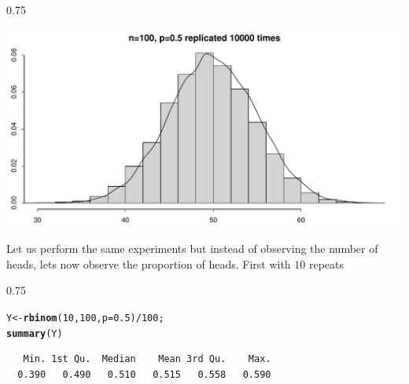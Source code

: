 \documentclass{beamer}\usepackage[]{graphicx}\usepackage[]{color}
\makeatletter
\newcommand{\hlnum}[1]{\textcolor[rgb]{0.2,0.2,0.2}{#1}}%
\newcommand{\hlopt}[1]{\textcolor[rgb]{0.102,0.102,0.102}{#1}}%
\newcommand{\hlstd}[1]{\textcolor[rgb]{0.102,0.102,0.102}{#1}}%
\newcommand{\hlkwb}[1]{\textcolor[rgb]{0.102,0.102,0.102}{#1}}%
\newcommand{\hlkwc}[1]{\textcolor[rgb]{0.2,0.2,0.2}{#1}}%
\newcommand{\hlkwd}[1]{\textcolor[rgb]{0.102,0.102,0.102}{\textbf{#1}}}%
\newenvironment{kframe}{%
 \def\at@end@of@kframe{}%
 \ifinner\ifhmode%
  \def\at@end@of@kframe{\end{minipage}}%
  \begin{minipage}{\columnwidth}%
 \fi\fi%
 \def\FrameCommand##1{\hskip\@totalleftmargin \hskip-\fboxsep
 \colorbox{shadecolor}{##1}\hskip-\fboxsep
     \hskip-\linewidth \hskip-\@totalleftmargin \hskip\columnwidth}%
 \MakeFramed {\advance\hsize-\width
   \@totalleftmargin\z@ \linewidth\hsize
   \@setminipage}}%
 {\par\unskip\endMakeFramed%
 \at@end@of@kframe}
\newenvironment{knitrout}{}{} %
\renewenvironment{knitrout}{\begin{spacing}{0.75}\begin{tiny}}{\end{tiny}\end{spacing}}
\makeatother
\begin{document}
\begin{frame}[fragile]

\begin{knitrout}\small
{}\color{fgcolor}

{\centering \includegraphics[width=0.89\linewidth]{figure/graphics-unnamed-chunk-7-1} 

}



\end{knitrout}

\end{frame}

\begin{frame}[fragile]

Let us perform the same experiments but instead of observing the number of heads, lets now observe the proportion of heads. First with $10$ repeats

\begin{knitrout}\small
{}\color{fgcolor}\begin{kframe}
\begin{alltt}
\hlstd{Y} \hlkwb{<-} \hlkwd{rbinom}\hlstd{(}\hlnum{10}\hlstd{,} \hlnum{100}\hlstd{,} \hlkwc{p}\hlstd{=}\hlnum{0.5}\hlstd{)}\hlopt{/} \hlnum{100}\hlstd{;}
\hlkwd{summary}\hlstd{(Y)}
\end{alltt}
\begin{verbatim}
   Min. 1st Qu.  Median    Mean 3rd Qu.    Max. 
  0.390   0.490   0.510   0.515   0.558   0.590 
\end{verbatim}
\end{kframe}
\end{knitrout}

\end{frame}
\end{document}

